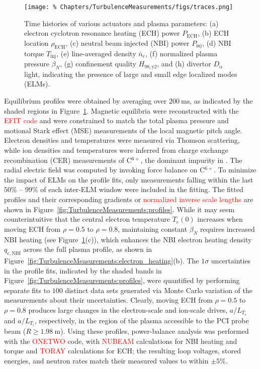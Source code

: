 \begin{figure}
  \centering
  \texttt{[image: \%
    Chapters/TurbulenceMeasurements/figs/traces.png]}
  \caption[Time histories of various actuators \& plasma parameters]{%
    Time histories of various actuators and plasma parameters:
    (a) electron cyclotron resonance heating (ECH) power $P_{\text{ECH}}$,
    (b) ECH location $\rho_{\text{ECH}}$,
    (c) neutral beam injected (NBI) power $P_{\text{inj}}$,
    (d) NBI torque $T_{\text{inj}}$,
    (e) line-averaged density $\bar{n}_e$,
    (f) normalized plasma pressure $\beta_N$,
    (g) confinement quality $H_{98,\text{y}2}$, and
    (h) divertor $D_{\alpha}$ light, indicating
    the presence of large and small edge localized modes (ELMs).
  }
\label{fig:TurbulenceMeasurements:traces}
\end{figure}

Equilibrium profiles were obtained
by averaging over $\SI{200}{\milli\second}$,
as indicated by the shaded regions
in Figure~\ref{fig:TurbulenceMeasurements:traces}.
Magnetic equilibria were
reconstructed with the \textcolor{red}{EFIT code} and
were constrained to match the total plasma pressure and
motional Stark effect (MSE) measurements
of the local magnetic pitch angle.
Electron densities and temperatures
were measured via Thomson scattering, while
ion densities and temperatures
were inferred from charge exchange recombination (CER) measurements
of C$^{6+}$, the dominant impurity in \diiid.
The radial electric field was computed
by invoking force balance on C$^{6+}$.
To minimize the impact of ELMs on the profile fits,
only measurements falling
within the last {$50\%$ -- $99\%$} of each inter-ELM window
were included in the fitting.
The fitted profiles and
their corresponding gradients or
\textcolor{red}{normalized inverse scale lengths}
are shown in
Figure~\ref{fig:TurbulenceMeasurements:profiles}.
While it may seem counterintuitive
that the central electron temperature $T_e(0)$
increases when moving ECH from $\rho = 0.5$ to $\rho = 0.8$,
maintaining constant $\beta_N$
requires increased NBI heating
(see Figure~\ref{fig:TurbulenceMeasurements:traces}(c)),
which enhances the NBI electron heating density $q_{e,\text{NBI}}$
across the full plasma profile,
as shown in Figure~\ref{fig:TurbulenceMeasurements:electron_heating}(b).
The $1\sigma$ uncertainties in the profile fits,
indicated by the shaded bands in
Figure~\ref{fig:TurbulenceMeasurements:profiles},
were quantified by
performing separate fits to $100$ distinct data sets
generated via Monte Carlo variation
of the measurements about their uncertainties.
Clearly, moving ECH from $\rho = 0.5$ to $\rho = 0.8$
produces large changes
in the electron-scale and ion-scale drives,
$a / L_{T_e}$ and $a / L_{T_i}$, respectively,
in the region of the plasma accessible to the PCI probe beam
($R \geq \SI{1.98}{\meter}$).
Using these profiles,
power-balance analysis was performed
with the \textcolor{red}{ONETWO} code,
with \textcolor{red}{NUBEAM} calculations
for NBI heating and torque and
\textcolor{red}{TORAY} calculations for ECH;
the resulting loop voltages, stored energies, and neutron rates
match their measured values to within $\pm 5\%$.

